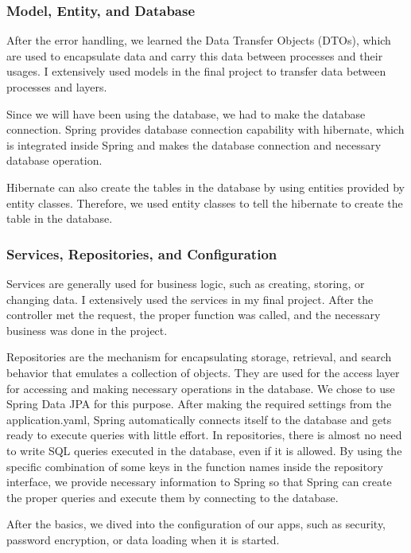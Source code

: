 \subsubsection{Model, Entity, and Database}

After the error handling, we learned the Data Transfer Objects (DTOs), which are used to encapsulate data and carry this data between processes and their usages. I extensively used models in the final project to transfer data between processes and layers.

Since we will have been using the database, we had to make the database connection. Spring provides database connection capability with hibernate, which is integrated inside Spring and makes the database connection and necessary database operation. 

Hibernate can also create the tables in the database by using entities provided by entity classes. Therefore, we used entity classes to tell the hibernate to create the table in the database.

\subsubsection{Services, Repositories, and Configuration}

Services are generally used for business logic, such as creating, storing, or changing data. I extensively used the services in my final project. After the controller met the request, the proper function was called, and the necessary business was done in the project.

Repositories are the mechanism for encapsulating storage, retrieval, and search behavior that emulates a collection of objects. They are used for the access layer for accessing and making necessary operations in the database. We chose to use Spring Data JPA for this purpose. After making the required settings from the application.yaml, Spring automatically connects itself to the database and gets ready to execute queries with little effort. In repositories, there is almost no need to write SQL queries executed in the database, even if it is allowed. By using the specific combination of some keys in the function names inside the repository interface, we provide necessary information to Spring so that Spring can create the proper queries and execute them by connecting to the database.

After the basics, we dived into the configuration of our apps, such as security, password encryption, or data loading when it is started.
